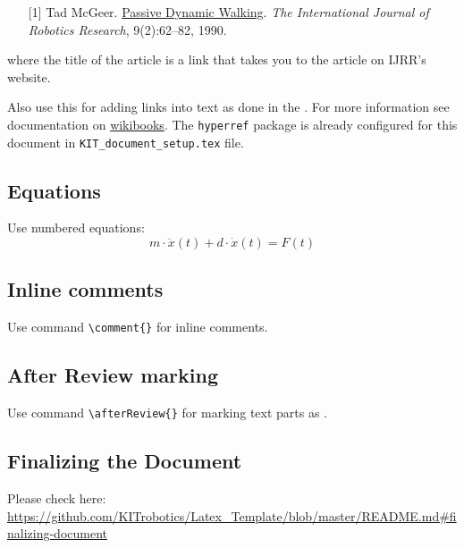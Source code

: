 \def\tmplabel#1{[#1]}

\begin{enumerate}
\item[\tmplabel{1}] Tad McGeer. \href{http://ijr.sagepub.com/content/9/2/62.abstract}{Passive Dynamic
Walking}. {\em The International Journal of Robotics Research}, 9(2):62--82,
1990.
\end{enumerate}
%
where the title of the article is a link that takes you to the article on IJRR's website.


Also use this for adding links into text as done in the \footnotemark[2]. For more information see documentation on \href{https://de.wikibooks.org/wiki/LaTeX-W%C3%B6rterbuch:_hyperref}{wikibooks}. The \texttt{hyperref} package is already configured for this document in \texttt{KIT\_document\_setup.tex} file.


\subsection{Equations}
Use numbered equations:
\begin{equation} \label{equ:equ}
  m \cdot \ddot{x}(t) + d \cdot \dot{x}(t) = F(t)
\end{equation}


\subsection{Inline comments}
Use command \texttt{\textbackslash comment\{\}} for inline comments.

\subsection{After Review marking}
Use command \texttt{\textbackslash afterReview\{\}} for marking text parts as .

\subsection{Finalizing the Document}
Please check here: \url{https://github.com/KITrobotics/Latex_Template/blob/master/README.md#finalizing-document}
